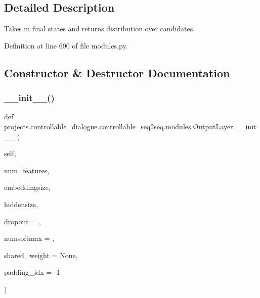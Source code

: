\subsection{Detailed Description}
\begin{DoxyVerb}Takes in final states and returns distribution over candidates.
\end{DoxyVerb}
 

Definition at line 690 of file modules.\+py.



\subsection{Constructor \& Destructor Documentation}
\mbox{\label{classprojects_1_1controllable__dialogue_1_1controllable__seq2seq_1_1modules_1_1OutputLayer_a28aa30cff698321cd14016bc0f9a5694}} 
\subsubsection{\texorpdfstring{\+\_\+\+\_\+init\+\_\+\+\_\+()}{\_\_init\_\_()}}
{\footnotesize\ttfamily def projects.\+controllable\+\_\+dialogue.\+controllable\+\_\+seq2seq.\+modules.\+Output\+Layer.\+\_\+\+\_\+init\+\_\+\+\_\+ (\begin{DoxyParamCaption}\item[{}]{self,  }\item[{}]{num\+\_\+features,  }\item[{}]{embeddingsize,  }\item[{}]{hiddensize,  }\item[{}]{dropout = {},  }\item[{}]{numsoftmax = {},  }\item[{}]{shared\+\_\+weight = {\ttfamily None},  }\item[{}]{padding\+\_\+idx = {\ttfamily -\/1} }\end{DoxyParamCaption})}

